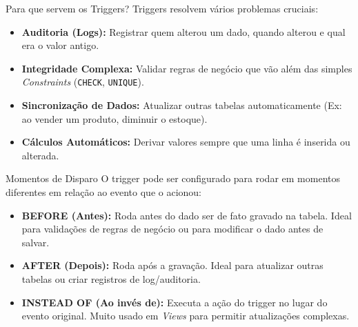 \documentclass[9pt]{beamer}
\begin{document}
\begin{frame}{Para que servem os Triggers?}
    Triggers resolvem vários problemas cruciais:
    
    \begin{itemize}
        \item \textbf{Auditoria (Logs):} Registrar quem alterou um dado, quando alterou e qual era o valor antigo.
        \item \textbf{Integridade Complexa:} Validar regras de negócio que vão além das simples \textit{Constraints} (\texttt{CHECK}, \texttt{UNIQUE}).
        \item \textbf{Sincronização de Dados:} Atualizar outras tabelas automaticamente (Ex: ao vender um produto, diminuir o estoque).
        \item \textbf{Cálculos Automáticos:} Derivar valores sempre que uma linha é inserida ou alterada.
    \end{itemize}
\end{frame}

\begin{frame}{Momentos de Disparo}
    O trigger pode ser configurado para rodar em momentos diferentes em relação ao evento que o acionou:
    
    \begin{itemize}
        \item \textbf{BEFORE (Antes):} Roda antes do dado ser de fato gravado na tabela. Ideal para validações de regras de negócio ou para modificar o dado antes de salvar.
        \item \textbf{AFTER (Depois):} Roda após a gravação. Ideal para atualizar outras tabelas ou criar registros de log/auditoria.
        \item \textbf{INSTEAD OF (Ao invés de):} Executa a ação do trigger no lugar do evento original. Muito usado em \textit{Views} para permitir atualizações complexas.
    \end{itemize}
\end{frame}
\end{document}
